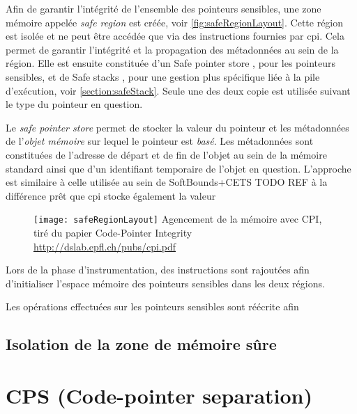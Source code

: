 Afin de garantir l'intégrité de l'ensemble des pointeurs sensibles, une zone mémoire appelée \textit{safe region} est créée, voir \autoref{fig:safeRegionLayout}. Cette région est isolée et ne peut être accédée que via des instructions fournies par \gls{cpi}. Cela permet de garantir l'intégrité et la propagation des métadonnées au sein de la région. Elle est ensuite constituée d'un \og Safe pointer store \fg, pour les pointeurs sensibles, et de \og Safe stacks \fg, pour une gestion plus spécifique liée à la pile d'exécution, voir \autoref{section:safeStack}. Seule une des deux copie est utilisée suivant le type du pointeur en question.

Le \textit{safe pointer store} permet de stocker la valeur du pointeur et les métadonnées de l'\textit{objet mémoire} sur lequel le pointeur est \textit{basé}. Les métadonnées sont constituées de l'adresse de départ et de fin de l'objet au sein de la mémoire standard ainsi que d'un identifiant temporaire de l'objet en question. L'approche est similaire à celle utilisée au sein de SoftBounds+CETS TODO REF à la différence prêt que \gls{cpi} stocke également la valeur



\begin{figure}[H]
	\centering
	\texttt{[image: safeRegionLayout]}
	{Agencement de la mémoire avec CPI, tiré du papier Code-Pointer Integrity}
	{\url{http://dslab.epfl.ch/pubs/cpi.pdf}}
	\label{fig:safeRegionLayout}
\end{figure}

Lors de la phase d'instrumentation, des instructions sont rajoutées afin d'initialiser l'espace mémoire des pointeurs sensibles dans les deux régions.


 Les opérations effectuées sur les pointeurs sensibles sont réécrite afin

\subsection{Isolation de la zone de mémoire sûre}

\section{CPS (Code-pointer separation)}

